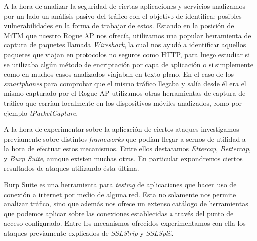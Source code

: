 \documentclass[10pt,a4paper]{article}
\begin{document}
A la hora de analizar la seguridad de ciertas aplicaciones y servicios analizamos por un lado un análisis pasivo del tráfico con el objetivo de identificar posibles vulnerabilidades en la forma de trabajar de estos. Estando en la posición de MiTM que nuestro Rogue AP nos ofrecía, utilizamos una popular herramienta de captura de paquetes llamada \textit{Wireshark}, la cual nos ayudó a identificar aquellos paquetes que viajan en protocolos no seguros como HTTP, para luego estudiar si se utilizaba algún método de encriptación por capa de aplicación o si simplemente como en muchos casos analizados viajaban en texto plano. En el caso de los \textit{smartphones} para comprobar que el mismo tráfico llegaba y salía desde él era el mismo capturado por el Rogue AP utilizamos otras herramientas de captura de tráfico que corrían localmente en los dispositivos móviles analizados, como por ejemplo \textit{tPacketCapture}.

A la hora de experimentar sobre la aplicación de ciertos ataques investigamos previamente sobre distintos \textit{frameworks} que podían llegar a sernos de utilidad a la hora de efectuar estos mecanismos. Entre ellos destacamos \textit{Ettercap}, \textit{Bettercap}, y \textit{Burp Suite}, aunque existen muchas otras. En particular expondremos ciertos resultados de ataques utilizando ésta última.

Burp Suite es una herramienta para \textit{testing} de aplicaciones que hacen uso de conexión a internet por medio de alguna red. Esta no solamente nos permite analizar tráfico, sino que además nos ofrece un extenso catálogo de herramientas que podemos aplicar sobre las conexiones establecidas a través del punto de acceso configurado. Entre los mecanismos ofrecidos experimentamos con ella los ataques previamente explicados de \textit{SSLStrip} y \textit{SSLSplit}.

\end{document}
